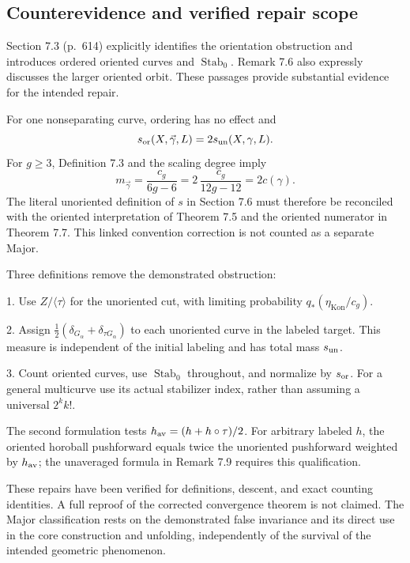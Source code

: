 \documentclass[10pt]{article}
\begin{document}
\subsection*{Counterevidence and verified repair scope}
Section 7.3 (p. 614) explicitly identifies the orientation obstruction and introduces ordered oriented curves and \(\operatorname{Stab}_0\). Remark 7.6 also expressly discusses the larger oriented orbit. These passages provide substantial evidence for the intended repair.\par
For one nonseparating curve, ordering has no effect and \[s_{\rm or}(X,\vec\gamma,L)=2s_{\rm un}(X,\gamma,L).\] For \(g\ge3\), Definition 7.3 and the scaling degree imply \[m_{\vec\gamma}=\frac{c_g}{6g-6}
       =2\,\frac{c_g}{12g-12}=2c(\gamma).\] The literal unoriented definition of \(s\) in Section 7.6 must therefore be reconciled with the oriented interpretation of Theorem 7.5 and the oriented numerator in Theorem 7.7. This linked convention correction is not counted as a separate Major.\par
Three definitions remove the demonstrated obstruction:\par
1. Use \(Z/\langle\tau\rangle\) for the unoriented cut, with limiting probability \(q_*(\eta_{\operatorname{Kon}}/c_g)\).\par
2. Assign \(\tfrac12(\delta_{G_\alpha}+\delta_{\tau G_\alpha})\) to each unoriented curve in the labeled target. This measure is independent of the initial labeling and has total mass \(s_{\rm un}\).\par
3. Count oriented curves, use \(\operatorname{Stab}_0\) throughout, and normalize by \(s_{\rm or}\). For a general multicurve use its actual stabilizer index, rather than assuming a universal \(2^k k!\).\par
The second formulation tests \(h_{\rm av}=(h+h\circ\tau)/2\). For arbitrary labeled \(h\), the oriented horoball pushforward equals twice the unoriented pushforward weighted by \(h_{\rm av}\); the unaveraged formula in Remark 7.9 requires this qualification.\par
These repairs have been verified for definitions, descent, and exact counting identities. A full reproof of the corrected convergence theorem is not claimed. The Major classification rests on the demonstrated false invariance and its direct use in the core construction and unfolding, independently of the survival of the intended geometric phenomenon.\par
\end{document}
